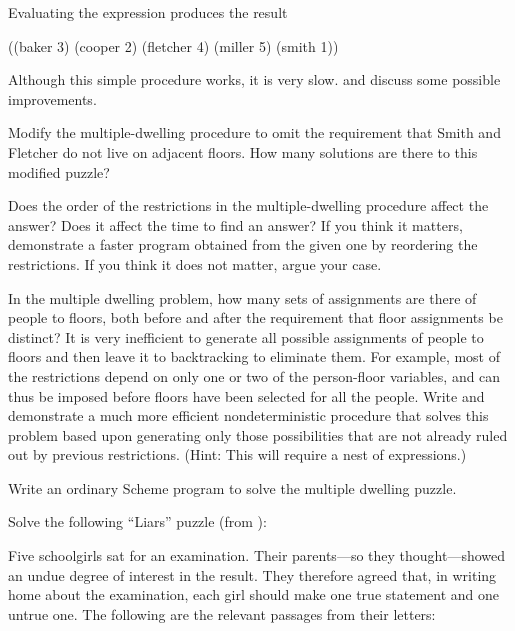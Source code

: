 \noindent
Evaluating the expression  produces the result

\begin{codeBlock}
((baker 3) (cooper 2) (fletcher 4) (miller 5) (smith 1))
\end{codeBlock}

\noindent
Although this simple procedure works, it is very slow.   and
 discuss some possible improvements.

\begin{exerciseGroup}
\label{Exercise 4.38}
 Modify the multiple-dwelling
procedure to omit the requirement that Smith and Fletcher do not live on
adjacent floors.  How many solutions are there to this modified puzzle?

\label{Exercise 4.39}
 Does the order of the
restrictions in the multiple-dwelling procedure affect the answer? Does it
affect the time to find an answer?  If you think it matters, demonstrate a
faster program obtained from the given one by reordering the restrictions.  If
you think it does not matter, argue your case.

\label{Exercise 4.40}
 In the multiple dwelling problem,
how many sets of assignments are there of people to floors, both before and
after the requirement that floor assignments be distinct?  It is very
inefficient to generate all possible assignments of people to floors and then
leave it to backtracking to eliminate them.  For example, most of the
restrictions depend on only one or two of the person-floor variables, and can
thus be imposed before floors have been selected for all the people.  Write and
demonstrate a much more efficient nondeterministic procedure that solves this
problem based upon generating only those possibilities that are not already
ruled out by previous restrictions.  (Hint: This will require a nest of
 expressions.)

\label{Exercise 4.41}
 Write an ordinary Scheme program
to solve the multiple dwelling puzzle.

\label{Exercise 4.42}
 Solve the following ``Liars''
puzzle (from ):

Five schoolgirls sat for an examination.  Their parents---so they
thought---showed an undue degree of interest in the result.  They therefore
agreed that, in writing home about the examination, each girl should make one
true statement and one untrue one.  The following are the relevant passages
from their letters:


\end{exerciseGroup}
